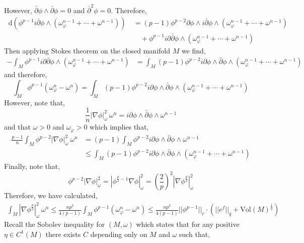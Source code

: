 \documentclass[12pt]{extarticle}
\renewcommand{\d}[1]{\: \mathrm{d}#1 \:}
\theoremstyle{definition}
\newcommand{\Vol}[1]{\mathrm{Vol}\left(#1\right)}
\begin{document}
However, $\bar{\partial} \phi \wedge \bar{\partial} \phi = 0$ and $\bar{\partial}^2 \phi = 0$. Therefore,
\begin{align*}
\d{\left(\phi^{p-1} i \bar{\partial} \phi \wedge \left( \omega_\varphi^{n-1} + \cdots + \omega^{n - 1} \right) \right)} & = (p - 1) \phi^{p-2} \partial \phi  \wedge i \bar{\partial} \phi \wedge \left( \omega_\varphi^{n-1} + \cdots + \omega^{n - 1} \right)  
\\
& \quad + \phi^{p-1} i \partial \bar{\partial} \phi \wedge \left( \omega_\varphi^{n-1} + \cdots + \omega^{n - 1} \right) 
\end{align*}
Then applying Stokes theorem on the closed manifold $M$ we find,
\begin{align*}
- \int_M \phi^{p-1} i \partial \bar{\partial} \phi \wedge \left( \omega_\varphi^{n-1} + \cdots + \omega^{n - 1} \right) & = \int_M (p - 1) \phi^{p-2} i \partial \phi \wedge \bar{\partial} \phi \wedge \left( \omega_\varphi^{n- 1} + \cdots + \omega^{n-1} \right) 
\end{align*}
and therefore,
\[ \int_M \phi^{p-1} (\omega_\varphi^n - \omega^n) = \int_M (p - 1) \phi^{p-2} i \partial \phi \wedge \bar{\partial} \phi \wedge \left( \omega_\varphi^{n- 1} + \cdots + \omega^{n-1} \right)  \]
However, note that,
\[ \frac{1}{n} |\nabla \phi |_{\omega}^2 \: \omega^n = i \partial \phi \wedge \bar{\partial} \phi \wedge \omega^{n - 1} \]
and that $\omega > 0$ and $\omega_\varphi > 0$ which implies that,
\begin{align*}
\frac{p-1}{n} \int_M \phi^{p-2} |\nabla \phi |_{\omega}^2 \: \omega^n & =  (p-1) \int_M \phi^{p-2} i \partial \phi \wedge \bar{\partial} \phi \wedge \omega^{n-1} 
\\
& \le \int_M (p - 1) \phi^{p-2} i \partial \phi \wedge \bar{\partial} \phi \wedge \left( \omega_\varphi^{n- 1} + \cdots + \omega^{n-1} \right) 
\end{align*}
Finally, note that,
\[ \phi^{p-2} |\nabla \phi |_{\omega}^2 = | \phi^{\frac{p}{2} - 1} \nabla \phi |_{\omega}^2 =  \left( \frac{2}{p} \right)^2 | \nabla \phi^{\frac{p}{2}} |_{\omega}^2 \]
Therefore, we have calculated,
\begin{align*}
\int_M |\nabla \phi^{\frac{p}{2}} |^2_\omega \: \omega^n \le \frac{n p^2}{4 (p - 1)} \int_M \phi^{p-1} (\omega^n_\varphi - \omega^n) \le  \frac{n p^2}{4 (p - 1)} || \phi^{p - 1} ||_r \cdot ( || e^f ||_q + \Vol{M}^{\frac{1}{q}})
\end{align*}
Recall the Sobolev inequality for $(M, \omega)$ which states that for any positive $\eta \in C^1(M)$ there exists $C$ depending only on $M$ and $\omega$ such that,
\end{document}
